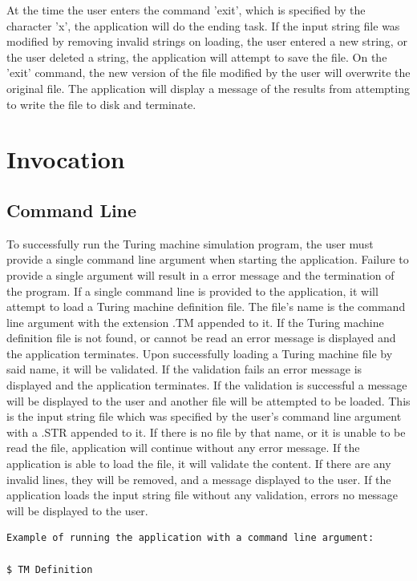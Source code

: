 \documentclass{report}
\begin{document}
\par
At the time the user enters the command 'exit', which is specified by the character 'x', the application will do the ending task. If the input string file was modified by removing invalid strings on loading, the user entered a new string, or the user deleted a string, the application will attempt to save the file. On the 'exit' command, the new version of the file modified by the user will overwrite the original file. The application will display a message of the results from attempting to write the file to disk and terminate.
 
\section{Invocation}

\subsection{Command Line} 
To successfully run the Turing machine simulation program, the user must provide a single command line argument when starting the application. Failure to provide a single argument will result in a error message and the termination of the program. If a single command line is provided to the application, it will attempt to load a Turing machine definition file. The file's name is the command line argument with the extension .TM appended to it. If the Turing machine definition file is not found, or cannot be read an error message is displayed and the application terminates. Upon successfully loading a Turing machine file by said name, it will be validated. If the validation fails an error message is displayed and the application terminates. If the validation is successful a message will be displayed to the user and another file will be attempted to be loaded. This is the input string file which was specified by the user's command line argument with a .STR appended to it. If there is no file by that name, or it is unable to be read the file, application will continue without any error message. If the application is able to load the file, it will validate the content. If there are any invalid lines, they will be removed, and a message displayed to the user. If the application loads the input string file without any validation, errors no message will be displayed to the user.

\begin{verbatim}
Example of running the application with a command line argument:

$ TM Definition
\end{verbatim}
\end{document}
